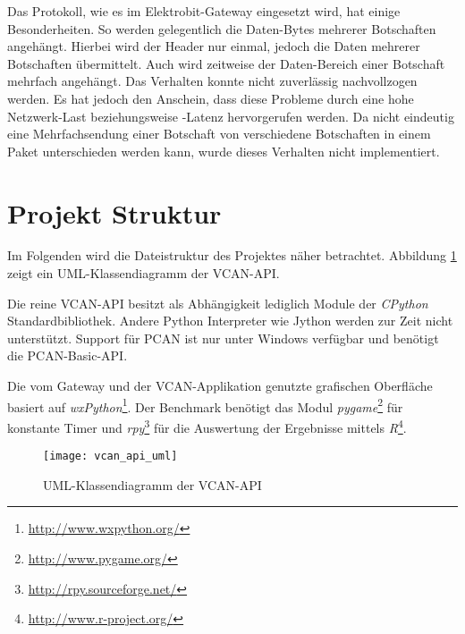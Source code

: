 Das Protokoll, wie es im Elektrobit-Gateway eingesetzt wird, hat einige Besonderheiten. So werden gelegentlich die Daten-Bytes mehrerer Botschaften angehängt. Hierbei wird der Header nur einmal, jedoch die Daten mehrerer Botschaften übermittelt. Auch wird zeitweise der Daten-Bereich einer Botschaft mehrfach angehängt. Das Verhalten konnte nicht zuverlässig nachvollzogen werden. Es hat jedoch den Anschein, dass diese Probleme durch eine hohe Netzwerk-Last beziehungsweise -Latenz hervorgerufen werden. Da nicht eindeutig eine Mehrfachsendung einer Botschaft von verschiedene Botschaften in einem Paket unterschieden werden kann, wurde dieses Verhalten nicht implementiert. 


\section{Projekt Struktur}
\label{sec:vcan_struktur}
Im Folgenden wird die Dateistruktur des Projektes näher betrachtet. Abbildung \ref{fig:vcan_api_uml} zeigt ein UML-Klassendiagramm der VCAN-API.

Die reine VCAN-API besitzt als Abhängigkeit lediglich Module der \emph{CPython} Standardbibliothek. Andere Python Interpreter wie Jython werden zur Zeit nicht unterstützt. Support für PCAN ist nur unter Windows verfügbar und benötigt die PCAN-Basic-API.

Die vom Gateway und der VCAN-Applikation genutzte grafischen Oberfläche basiert auf \emph{wxPython}\footnote{\url{http://www.wxpython.org/}}. Der Benchmark benötigt das Modul \emph{pygame}\footnote{\url{http://www.pygame.org/}} für konstante Timer und \emph{rpy}\footnote{\url{http://rpy.sourceforge.net/}} für die Auswertung der Ergebnisse mittels \emph{R}\footnote{\url{http://www.r-project.org/}}.

\begin{figure}[ht]
\centering
\texttt{[image: vcan\_api\_uml]}
\caption{UML-Klassendiagramm der VCAN-API}
\label{fig:vcan_api_uml}
\end{figure}

